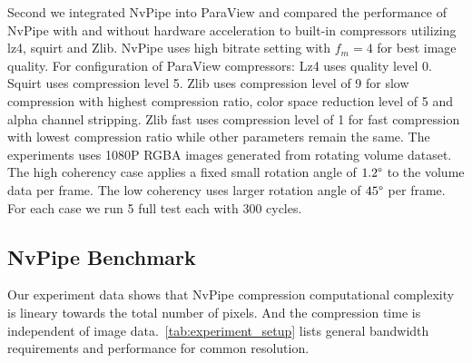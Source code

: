 \documentclass[review]{vgtc}                 %
\begin{document}
Second we integrated NvPipe into ParaView and compared the performance of NvPipe with and without hardware acceleration to built-in compressors utilizing lz4, squirt and Zlib. NvPipe uses high bitrate setting with \(f_m=4\) for best image quality. For configuration of ParaView compressors: Lz4 uses quality level 0. Squirt uses compression level 5. Zlib uses compression level of 9 for slow compression with highest compression ratio, color space reduction level of 5 and alpha channel stripping. Zlib fast uses compression level of 1 for fast compression with lowest compression ratio while other parameters remain the same. The experiments uses 1080P RGBA images generated from rotating volume dataset. The high coherency case applies a fixed small rotation angle of \(1.2\degree\) to the volume data per frame. The low coherency uses larger rotation angle of \(45\degree\) per frame. For each case we run 5 full test each with 300 cycles.

\subsection{NvPipe Benchmark}

Our experiment data shows that NvPipe compression computational complexity is lineary towards the total number of pixels. And the compression time is independent of image data.~\cref{tab:experiment_setup} lists general bandwidth requirements and performance for common resolution. 

%
\end{document}
